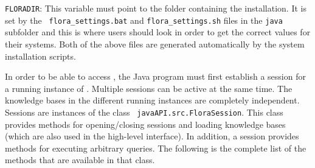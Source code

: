 \label{page-floradir}
{\tt FLORADIR}: This variable must point to the folder
containing the \FLSYSTEM installation.
It is set by the {\tt
  flora\_settings.bat} and {\tt flora\_settings.sh} files in the {\tt java}
subfolder and this is where users should look in order to get the
correct values for their systems.
Both of the above files are generated automatically by the system installation
scripts.

In order to be able to access \FLSYSTEM, the Java program must first establish
a session for a running instance of \FLSYSTEM. Multiple sessions can be active
at the same time. The knowledge bases in the different running instances
are completely independent. Sessions are instances of
the class {\tt
javaAPI.src.FloraSession}. This class provides methods
for opening/closing sessions and loading \FLSYSTEM knowledge bases
(which are also used in the high-level
interface). In addition, a session provides 
methods for executing arbitrary \FLSYSTEM queries. The following is the complete
list of the methods that are available in that class.
